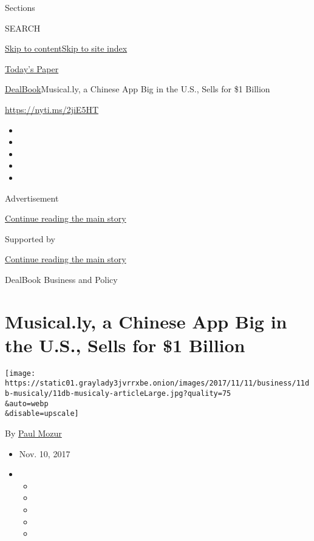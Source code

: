 Sections

SEARCH

\protect\hyperlink{site-content}{Skip to
content}\protect\hyperlink{site-index}{Skip to site index}

\href{https://myaccount.nytimes3xbfgragh.onion/auth/login?response_type=cookie\&client_id=vi}{}

\href{https://www.nytimes3xbfgragh.onion/section/todayspaper}{Today's
Paper}

\href{/section/business/dealbook}{DealBook}\textbar{}Musical.ly, a
Chinese App Big in the U.S., Sells for \$1 Billion

\href{https://nyti.ms/2jiE5HT}{https://nyti.ms/2jiE5HT}

\begin{itemize}
\item
\item
\item
\item
\item
\end{itemize}

Advertisement

\protect\hyperlink{after-top}{Continue reading the main story}

Supported by

\protect\hyperlink{after-sponsor}{Continue reading the main story}

DealBook Business and Policy

\hypertarget{musically-a-chinese-app-big-in-the-us-sells-for-1-billion}{%
\section{Musical.ly, a Chinese App Big in the U.S., Sells for \$1
Billion}\label{musically-a-chinese-app-big-in-the-us-sells-for-1-billion}}

\texttt{[image: https://static01.graylady3jvrrxbe.onion/images/2017/11/11/business/11db-musicaly/11db-musicaly-articleLarge.jpg?quality=75\\\&auto=webp\\\&disable=upscale]}

By \href{https://www.nytimes3xbfgragh.onion/by/paul-mozur}{Paul Mozur}

\begin{itemize}
\item
  Nov. 10, 2017
\item
  \begin{itemize}
  \item
  \item
  \item
  \item
  \item
  \end{itemize}
\end{itemize}

